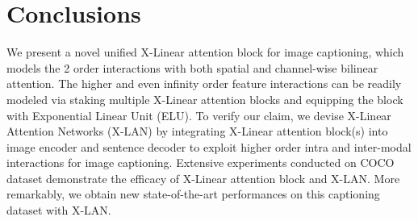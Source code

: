 \documentclass[10pt,twocolumn,letterpaper]{article}
\begin{document}
\section{Conclusions}
We present a novel unified X-Linear attention block for image captioning, which models the 2 order interactions with both spatial and channel-wise bilinear attention. The higher and even infinity order feature interactions can be readily modeled via staking multiple X-Linear attention blocks and equipping the block with Exponential Linear Unit (ELU). To verify our claim, we devise X-Linear Attention Networks (X-LAN) by integrating X-Linear attention block(s) into image encoder and sentence decoder to exploit higher order intra and inter-modal interactions for image captioning.
Extensive experiments conducted on COCO dataset demonstrate the efficacy of X-Linear attention block and X-LAN.
More remarkably, we obtain new state-of-the-art performances on this captioning dataset with X-LAN.

{\small


}
\end{document}

